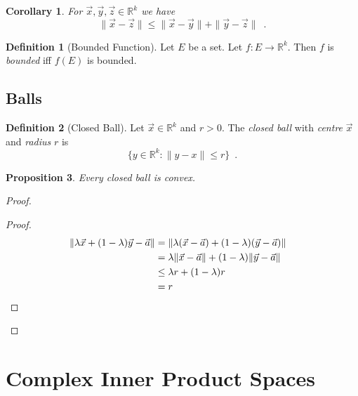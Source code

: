 \documentclass{book}
\let\qed\relax
\newtheorem{prop}{Proposition}[chapter]
\newtheorem{cor}{Corollary}[prop]
\theoremstyle{definition}
\newtheorem{df}[prop]{Definition}
\begin{document}
\begin{cor}
\label{cor:triangle_inequality}
For $\vec{x}, \vec{y}, \vec{z} \in \mathbb{R}^k$ we have
\[ \| \vec{x} - \vec{z} \| \leq \| \vec{x} - \vec{y} \| + \| \vec{y} - \vec{z} \| \enspace . \]
\end{cor}

\begin{df}[Bounded Function]
Let $E$ be a set. Let $f : E \rightarrow \mathbb{R}^k$. Then $f$ is \emph{bounded} iff $f(E)$ is bounded.
\end{df}

\section{Balls}

\begin{df}[Closed Ball]
Let $\vec{x} \in \mathbb{R}^k$ and $r > 0$. The \emph{closed ball} with \emph{centre} $\vec{x}$ and \emph{radius} $r$ is
\[ \{ y \in \mathbb{R}^k : \| y - x \| \leq r \} \enspace . \]
\end{df}

\begin{prop}
Every closed ball is convex.
\end{prop}

\begin{proof}
\pf
{}
\begin{proof}
\pf
\begin{align*}
\| \lambda \vec{x} + (1 - \lambda) \vec{y} - \vec{a} \|
& = \| \lambda (\vec{x} - \vec{a}) + (1 - \lambda) (\vec{y} - \vec{a}) \| \\
& = \lambda \| \vec{x} - \vec{a} \| + (1 - \lambda) \| \vec{y} - \vec{a} \| \\
& \leq \lambda r + (1 - \lambda) r \\
& = r & \qed
\end{align*}
\end{proof}
\qed
\end{proof}

\chapter{Complex Inner Product Spaces}

\newcommand{\ket}[1]{\ensuremath{\left| {#1} \right\rangle}}
\newcommand{\bra}[1]{\ensuremath{\left\langle {#1} \right|}}
\end{document}
